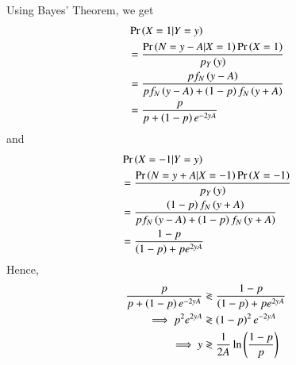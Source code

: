 \documentclass[journal,12pt,twocolumn]{IEEEtran}
\renewcommand\thesection{\arabic{section}}
\begin{document}
\begin{enumerate}[label=\thesection.\arabic*
,ref=\thesection.\theenumi]
\solution Using Bayes' Theorem, we get
\begin{align}
	&\Pr\left(X = 1 | Y = y\right) \nonumber \\
	&= \frac{\Pr\left(N = y - A | X = 1\right)\Pr\left(X = 1\right)}{p_Y\left(y\right)} \\ 
	&= \frac{pf_N\left(y - A\right)}{pf_N\left(y - A\right) + \left(1 - p\right)f_N\left(y + A\right)} \\
	&= \frac{p}{p + \left(1 - p\right)e^{-2yA}} 
\end{align}
and
\begin{align}
	&\Pr\left(X = -1 | Y = y\right) \nonumber \\
	&= \frac{\Pr\left(N = y + A | X = -1\right)\Pr\left(X = -1\right)}{p_Y\left(y\right)} \\ 
	&= \frac{\left(1 - p\right)f_N\left(y + A\right)}{pf_N\left(y - A\right) + \left(1 - p\right)f_N\left(y + A\right)} \\
	&= \frac{1 - p}{\left(1 - p\right) + pe^{2yA}} 
\end{align}
Hence, 
\begin{align}
	\frac{p}{p + \left(1 - p\right)e^{-2yA}} &\gtrless \frac{1 - p}{\left(1 - p\right) + pe^{2yA}} \\
	\implies p^2e^{2yA} &\gtrless \left(1 - p\right)^2e^{-2yA} \\
	\implies y &\gtrless \frac{1}{2A}\ln{\ensuremath{\left(\frac{1 - p}{p}\right)}}
\end{align}
\end{enumerate}

\end{document}
